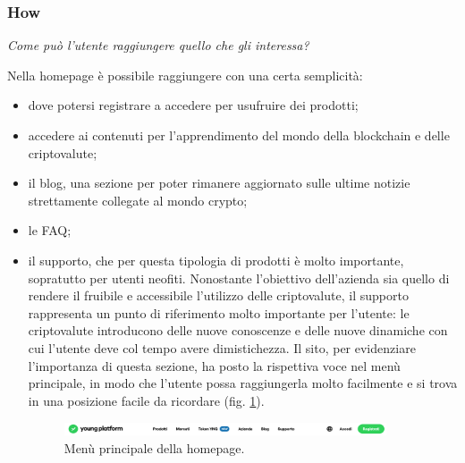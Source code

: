 \subsubsection{How}

\centerline{\textit{Come può l'utente raggiungere quello che gli 
interessa?}}
Nella homepage è possibile raggiungere con una certa semplicità:
\begin{itemize}
  \item dove potersi registrare a accedere per usufruire dei prodotti;
  \item accedere ai contenuti per l'apprendimento del mondo della 
  blockchain e delle criptovalute;
  \item il blog, una sezione per poter rimanere aggiornato sulle ultime 
  notizie strettamente collegate al mondo crypto;
  \item le FAQ;
  \item il supporto, che per questa tipologia di prodotti è molto 
  importante, sopratutto per utenti neofiti. Nonostante l'obiettivo 
  dell'azienda sia quello di rendere il fruibile e accessibile l'utilizzo 
  delle criptovalute, il supporto rappresenta un punto di riferimento molto 
  importante per l'utente: le criptovalute introducono delle nuove 
  conoscenze e delle nuove dinamiche con cui l'utente deve col tempo avere 
  dimistichezza. Il sito, per evidenziare l'importanza di questa sezione, 
  ha posto la rispettiva voce nel menù principale, in modo che l'utente 
  possa raggiungerla molto facilmente e si trova in una posizione facile 
  da ricordare (fig. \ref{fig:main-menu}).

  \begin{figure}[H]
    \centering
    \includegraphics[width=0.90\textwidth]{res/images/main-menu.png}
    \caption{Menù principale della homepage.}
    \label{fig:main-menu}
  \end{figure}
\end{itemize}

